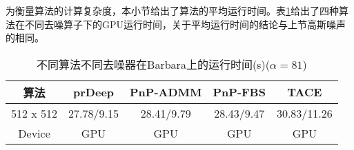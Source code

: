 为衡量算法的计算复杂度，本小节给出了算法的平均运行时间。表\ref{table:3-9}给出了四种算法在不同去噪算子下的GPU运行时间，关于平均运行时间的结论与上节高斯噪声的相同。
\begin{table}[!htbp]
	\def\arraystretch{1.4}\centering{}
	\caption{不同算法不同去噪器在Barbara上的运行时间(s)($\alpha=81$)}
	\label{table:3-9}
	\begin{tabular*}{\linewidth}{@{}@{\extracolsep{\fill}}ccccc@{}}
		\toprule
		算法 & prDeep & PnP-ADMM & PnP-FBS & TACE	\\ %
		\midrule
		512 x 512        & {\color{blue}27.78}/{\color{blue}9.15}   & 28.41/9.79  & 28.43/9.47 & 30.83/11.26\\
		Device	         & GPU   & GPU  & GPU 	& GPU \\
		\bottomrule
	\end{tabular*}
\end{table}

